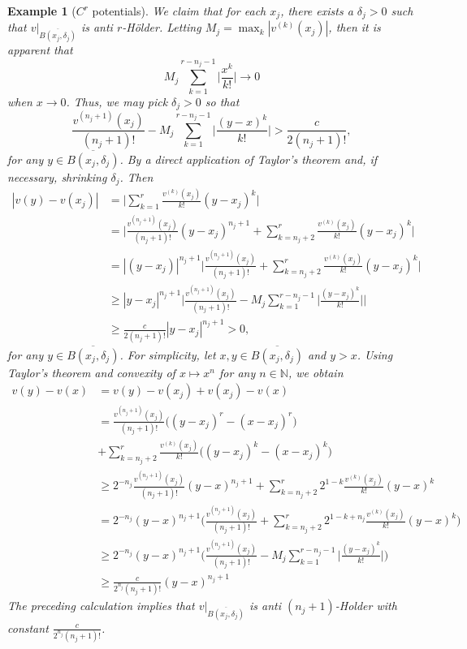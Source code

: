 \documentclass{amsart}
\newtheorem{example}{Example}
\newcommand{\NN}{\mathbb{N}}
\begin{document}
\begin{example}[$C^r$ potentials]
    We claim that for each $x_j$, there exists a $\delta_j>0$ such that $v|_{\overline{B(x_j,\delta_j)}}$ is anti $r$-H\"older. Letting $M_j = \max_{k} |v^{(k)}(x_j)|$, then it is apparent that 
    \[M_j\sum_{k=1}^{r-n_j-1} \Big|\frac{x^k}{k!}\Big| \rightarrow 0\]
    when $x \rightarrow 0$. Thus, we may pick $\delta_j>0$ so that
    \[\frac{v^{(n_j+1)}(x_j)}{(n_j+1)!}  - M_j\sum_{k=1}^{r-n_j-1} \Big|\frac{(y-x)^k}{k!}\Big| > \frac{c}{2(n_j+1)!},\]
    for any $y\in \overline{B(x_j,\delta_j)}$. By a direct application of Taylor's theorem and, if necessary, shrinking $\delta_j$. Then
    \begin{align*}
        |v(y) - v(x_j)| &= \Bigg|\sum_{k = 1}^r \frac{v^{(k)}(x_j)}{k!}(y-x_j)^k\Bigg| \\
        &= \Bigg|\frac{v^{(n_j+1)}(x_j)}{(n_j+1)!} (y-x_j)^{n_j+1} + \sum_{k = n_j+2}^r \frac{v^{(k)}(x_j)}{k!}(y-x_j)^k\Bigg|\\
        &= |(y-x_j)|^{n_j+1} \Bigg|\frac{v^{(n_j+1)}(x_j)}{(n_j+1)!} + \sum_{k = n_j+2}^r \frac{v^{(k)}(x_j)}{k!}(y-x_j)^k\Bigg|\\
        &\geq |y-x_j|^{n_j+1}\Bigg|\frac{v^{(n_j+1)}(x_j)}{(n_j+1)!}  - M_j\sum_{k=1}^{r-n_j-1} \Big|\frac{(y-x_j)^k}{k!}\Big|\Bigg|\\
        &\geq \frac{c}{2(n_j+1)!}|y-x_j|^{n_j+1} > 0,
    \end{align*}
    for any $y\in \overline{B(x_j,\delta_j)}$. For simplicity, let $x,y\in \overline{B(x_j,\delta_j)}$ and $y>x$. Using Taylor's theorem and convexity of $x\mapsto x^n$ for any $n\in\NN$, we obtain
    \begin{align*}
        v(y) - v(x) &= v(y) - v(x_j) + v(x_j) - v(x)\\
        &= \frac{v^{(n_j+1)}(x_j)}{(n_j+1)!}\Bigg((y-x_j)^r - (x - x_j)^r\Bigg) \\
        &+ \sum_{k = n_j+2}^r \frac{v^{(k)}(x_j)}{k!}\Bigg((y-x_j)^k - (x - x_j)^k\Bigg)\\
        &\geq 2^{-n_j}\frac{v^{(n_j+1)}(x_j)}{(n_j+1)!} (y-x)^{n_j+1} + \sum_{k = n_j+2}^r 2^{1-k}\frac{v^{(k)}(x_j)}{k!}(y-x)^k\\
        &= 2^{-n_j}(y-x)^{n_j+1}\Bigg(\frac{v^{(n_j+1)}(x_j)}{(n_j+1)!} + \sum_{k = n_j+2}^r 2^{1-k+n_j}\frac{v^{(k)}(x_j)}{k!}(y-x)^k \Bigg)\\
        &\geq 2^{-n_j}(y-x)^{n_j+1}\Bigg(\frac{v^{(n_j+1)}(x_j)}{(n_j+1)!}  - M_j\sum_{k=1}^{r-n_j-1} \Big|\frac{(y-x_j)^k}{k!}\Big|\Bigg)\\
        &\geq \frac{c}{2^{n_j}(n_j+1)!}(y-x)^{n_j + 1}
    \end{align*}
    The preceding calculation implies that $v|_{\overline{B(x_j,\delta_j)}}$ is anti $(n_j+1)$-Holder with constant $\frac{c}{2^{n_j}(n_j+1)!}$.
    

\end{example}
\end{document}
